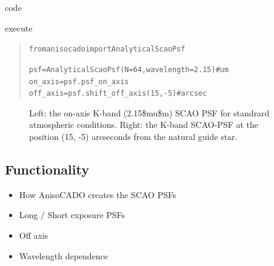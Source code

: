 \begin{DUclass}{code}
\begin{DUclass}{execute}
\begin{quote}
\begin{alltt}
from anisocado import AnalyticalScaoPsf

psf = AnalyticalScaoPsf(N=64, wavelength=2.15)  # um
on_axis = psf.psf_on_axis
off_axis = psf.shift_off_axis(15, -5)   # arcsec
\end{alltt}
\end{quote}
\end{DUclass}
\end{DUclass}


\begin{figure}
\noindent{}\label{fig-anisocado-basic-example}

\caption{Left: the on-axis K-band (2.15\$mu\$m) SCAO PSF for standrard atmospheric conditions.
Right: the K-band SCAO-PSF at the position (15, -5) arcseconds from the natural guide star.}
\end{figure}


\subsection{Functionality%
  \label{functionality}%
}

\begin{itemize}
\item How AnisoCADO creates the SCAO PSFs

\item Long / Short exposure PSFs

\item Off axis

\item Wavelength dependence
\end{itemize}
